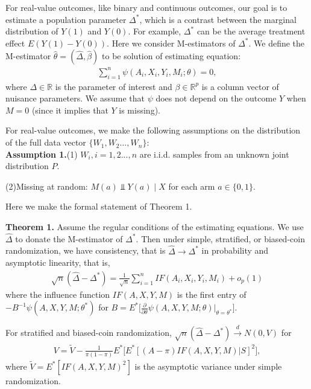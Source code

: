 \documentclass{article}
\begin{document}
For real-value outcomes, like binary and continuous outcomes, our goal is to estimate a population parameter $\Delta^*$, which is a contrast between the marginal distribution of $Y(1)$ and $Y(0)$. For example, $\Delta^*$ can be the average treatment effect $E(Y(1)-Y(0))$. Here we consider M-estimators of $\Delta^*$. We define the M-estimator $\hat{\theta}=(\hat{\Delta},\hat{\beta})$ to be solution of estimating equation:
\begin{align}\label{estiamte eq}
    \sum_{i=1}^n \psi(A_i,X_i,Y_i,M_i;\theta)=0,
\end{align}
where $\Delta \in \mathbb{R}$ is the parameter of interest and $\beta \in \mathbb{R}^p$ is a column vector of  nuisance parameters. We assume that $\psi$ does not depend on the outcome $Y$ when $M=0$ (since it implies that $Y$ is missing).

For real-value outcomes, we make the following assumptions on the distribution of the full data vector $\{ W_1,W_2...,W_n\}$:\\
\textbf{Assumption 1.}(1) $W_i,i=1,2...,n$ are i.i.d. samples from an unknown joint distribution
$P$.

(2)Missing at random: $M(a) \Vbar Y(a) \mid X$ for each arm $a \in \{0, 1\}$.

Here we make the formal statement of Theorem 1.

\textbf{Theorem 1.} Assume the regular conditions of the estimating equations.
We use $\hat{\Delta}$ to donate the M-estimator of $\Delta^{*}$. Then under simple, stratified, or biased-coin randomization, we have consistency,
that is $\hat{\Delta} \rightarrow \Delta^{*}$ in probability and asymptotic linearity, that is,
\begin{align}\label{as linear}
    \sqrt{n}(\hat{\Delta} - \Delta^{*})=\frac{1}{\sqrt{n}}\sum_{i=1}^n IF(A_i,X_i,Y_i,M_i)+o_p(1)
\end{align}
where the influence function $IF(A,X,Y,M)$ is the first entry of $-B^{-1}\psi(A,X,Y,M;\theta^{*})$ for $B=E^{*}\Big[\frac{\partial}{\partial\theta}\psi(A,X,Y,M;\theta)\Big|_{\theta=\theta^*}\Big]$.

For stratified and biased-coin randomization, $\sqrt{n}(\hat{\Delta} - \Delta^{*}) \stackrel{d}{\rightarrow}N(0,V)$ for 
\begin{align}\label{real-value variance}
    V=\widetilde{V}-\frac{1}{\pi(1-\pi)}E^{*}\big[E^{*}[(A-\pi)IF(A,X,Y,M)|S]^2\big],
\end{align}
where $\widetilde{V}=E^{*}[IF(A,X,Y,M)^2]$ is the asymptotic variance
under simple randomization.
\end{document}
